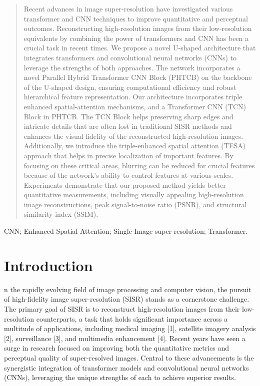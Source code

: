 \documentclass{ieeeaccess}
\begin{document}
\begin{abstract}
Recent advances in image super-resolution have investigated various transformer and CNN techniques to improve quantitative and perceptual outcomes. Reconstructing high-resolution images from their low-resolution equivalents by combining the power of transformers and CNN has been a crucial task in recent times. We propose a novel U-shaped architecture that integrates transformers and convolutional neural networks (CNNs) to leverage the strengths of both approaches. The network incorporates a novel Parallel Hybrid Transformer CNN Block (PHTCB) on the backbone of the U-shaped design, ensuring computational efficiency and robust hierarchical feature representation. Our architecture incorporates triple enhanced spatial-attention mechanisms, and a Transformer CNN (TCN) Block in PHTCB. The TCN Block helps preserving sharp edges and intricate details that are often lost in traditional SISR methods and enhances the visual fidelity of the reconstructed high-resolution images. Additionally, we introduce the triple-enhanced spatial attention (TESA) approach that helps in precise localization of important features. By focusing on these critical areas, blurring can be reduced for crucial features because of the network's ability to control features at various scales. Experiments demonstrate that our proposed method yields better quantitative measurements, including visually appealing high-resolution image reconstructions, peak signal-to-noise ratio (PSNR), and structural similarity index (SSIM).
\end{abstract}

\begin{keywords}
CNN; Enhanced Spatial Attention; Single-Image super-resolution; Transformer. 
\end{keywords}

\titlepgskip=-15pt

\maketitle

\section{Introduction}
\label{sec:introduction}
n the rapidly evolving field of image processing and computer vision, the pursuit of high-fidelity image super-resolution (SISR) stands as a cornerstone challenge. The primary goal of SISR is to reconstruct high-resolution images from their low-resolution counterparts, a task that holds significant importance across a multitude of applications, including medical imaging [1], satellite imagery analysis [2], surveillance [3], and multimedia enhancement [4]. Recent years have seen a surge in research focused on improving both the quantitative metrics and perceptual quality of super-resolved images. Central to these advancements is the synergistic integration of transformer models and convolutional neural networks (CNNs), leveraging the unique strengths of each to achieve superior results.
\end{document}
